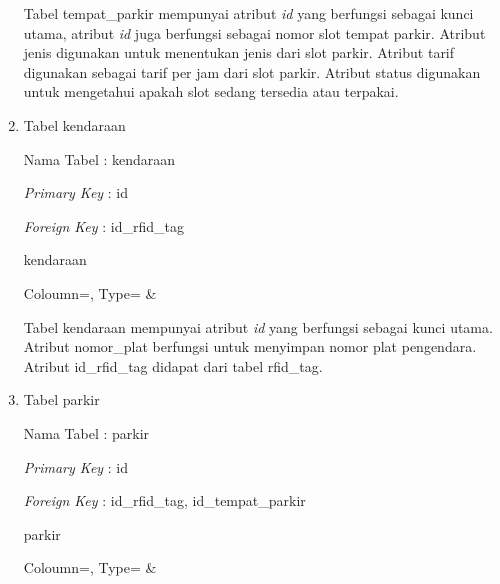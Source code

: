 \begin{enumerate}[topsep=0pt,itemsep=0pt,partopsep=0pt, parsep=0pt]
    Tabel tempat\_parkir mempunyai atribut \textit{id} yang berfungsi sebagai kunci utama, atribut \textit{id} juga berfungsi sebagai nomor slot tempat parkir. Atribut jenis digunakan untuk menentukan jenis dari slot parkir. Atribut tarif digunakan sebagai tarif per jam dari slot parkir. Atribut status digunakan untuk mengetahui apakah slot sedang tersedia atau terpakai.

    \item Tabel kendaraan

    Nama Tabel : kendaraan

    \textit{Primary Key} : id

    \textit{Foreign Key} : id\_rfid\_tag

    \begin{table} [H]
        \centering 
        \caption{kendaraan}
        \label{table:db_kendaraan}
            {
                Coloumn=\Coloumn, 
                Type=\Type}
            {
                \Coloumn & 
                \Type}
    \end{table}

    Tabel kendaraan mempunyai atribut \textit{id} yang berfungsi sebagai kunci utama. Atribut nomor\_plat berfungsi untuk menyimpan nomor plat pengendara. Atribut id\_rfid\_tag didapat dari tabel rfid\_tag.

    \item Tabel parkir

    Nama Tabel : parkir

    \textit{Primary Key} : id

    \textit{Foreign Key} : id\_rfid\_tag, id\_tempat\_parkir

    \begin{table} [H]
        \centering
        \caption{parkir}
        \label{table:db_parkir}
            {
                Coloumn=\Coloumn, 
                Type=\Type}
            {
                \Coloumn & 
                \Type}
    \end{table}


\end{enumerate}
